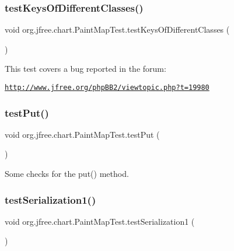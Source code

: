 \subsubsection{\texorpdfstring{test\+Keys\+Of\+Different\+Classes()}{testKeysOfDifferentClasses()}}
{\footnotesize\ttfamily void org.\+jfree.\+chart.\+Paint\+Map\+Test.\+test\+Keys\+Of\+Different\+Classes (\begin{DoxyParamCaption}{ }\end{DoxyParamCaption})}

This test covers a bug reported in the forum\+:

\href{http://www.jfree.org/phpBB2/viewtopic.php?t=19980}{\tt http\+://www.\+jfree.\+org/php\+B\+B2/viewtopic.\+php?t=19980} \mbox{\label{classorg_1_1jfree_1_1chart_1_1_paint_map_test_af111df58307a9accc3fd627f9132fa97}} 
\subsubsection{\texorpdfstring{test\+Put()}{testPut()}}
{\footnotesize\ttfamily void org.\+jfree.\+chart.\+Paint\+Map\+Test.\+test\+Put (\begin{DoxyParamCaption}{ }\end{DoxyParamCaption})}

Some checks for the put() method. \mbox{\label{classorg_1_1jfree_1_1chart_1_1_paint_map_test_a6dfab1bc3317cfed284e066c57ff9a9f}} 
\subsubsection{\texorpdfstring{test\+Serialization1()}{testSerialization1()}}
{\footnotesize\ttfamily void org.\+jfree.\+chart.\+Paint\+Map\+Test.\+test\+Serialization1 (\begin{DoxyParamCaption}{ }\end{DoxyParamCaption})}

